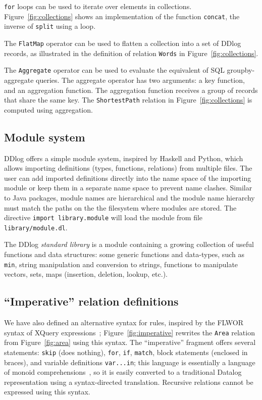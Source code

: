 \texttt{for} loops can be used to iterate over elements in
collections.  Figure~\ref{fig:collections} shows an implementation of
the function \texttt{concat}, the inverse of \texttt{split} using a
loop.

The \texttt{FlatMap} operator can be used to flatten
a collection into a set of DDlog records, as illustrated in the definition of
relation \texttt{Words} in Figure~\ref{fig:collections}.

The \texttt{Aggregate} operator can be used to evaluate the equivalent
of SQL groupby-aggregate queries.  The aggregate operator has two
arguments: a key function, and an aggregation function.  The
aggregation function receives a group of
records that share the same key.  The
\texttt{ShortestPath} relation in Figure~\ref{fig:collections} is
computed using aggregation.

\subsection{Module system}

DDlog offers a simple module system, inspired by Haskell and Python,
which allows importing definitions (types, functions, relations) from
multiple files.  The user can add imported definitions directly into the
name space of the importing module or keep them in a separate name space to
prevent name clashes.  Similar to Java packages, module names are
hierarchical and the module name hierarchy must match the paths on the
the filesystem where modules are stored.  The directive \texttt{import
  library.module} will load the module from file
\texttt{library/module.dl}.

The DDlog \emph{standard library} is a module containing a growing
collection of useful functions and data structures: some generic
functions and data-types, such as \texttt{min}, string manipulation
and conversion to strings, functions to manipulate vectors, sets, maps
(insertion, deletion, lookup, etc.).

\subsection{``Imperative'' relation definitions}

We have also defined an alternative syntax for rules, inspired by the
FLWOR syntax of XQuery expressions~\cite{boag-xquery02};
Figure~\ref{fig:imperative} rewrites the \texttt{Area} relation from
Figure~\ref{fig:area} using this syntax.  The ``imperative'' fragment
offers several statements: \texttt{skip} (does nothing), \texttt{for},
\texttt{if}, \texttt{match}, block statements (enclosed in braces),
and variable definitions \texttt{var...in}; this language is
essentially a language of monoid
comprehensions~\cite{fegaras-sigmod95}, so it is easily converted to a
traditional Datalog representation using a syntax-directed
translation.  Recursive relations cannot be expressed using this
syntax.

